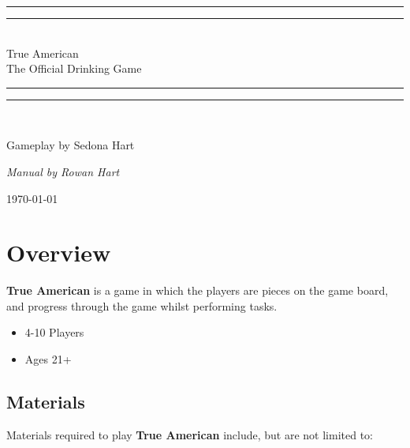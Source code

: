 \documentclass[12pt]{article}
\newlength{\drop}
\begin{document}
\begin{titlepage}
    \textheight
    \centering
    \vspace*{\baselineskip}
    \rule{\textwidth}{1.6pt}\vspace*{-\baselineskip}\vspace*{2pt}
    \rule{\textwidth}{0.4pt}\\[\baselineskip]
    {\LARGE True American \\[0.3\baselineskip] The Official Drinking Game}\\[0.2\baselineskip]
    \rule{\textwidth}{0.4pt}\vspace*{-\baselineskip}\vspace{3.2pt}
    \rule{\textwidth}{1.6pt}\\[\baselineskip]
    \scshape
    \vspace*{2\baselineskip}
    {\Large Gameplay by Sedona Hart\par}
    {\itshape Manual by Rowan Hart\par}
    \vspace*{2\baselineskip}
    {\scshape \today} \\
    \vfill
\end{titlepage}

\section{Overview} \label{overview}

\textbf{True American} is a game in which the players are pieces on the game board, and progress through the game whilst performing tasks. \\

\begin{itemize}
\item 4-10 Players
\item Ages 21+
\end{itemize}

\subsection{Materials}

Materials required to play \textbf{True American} include, but are not limited to: \\
\end{document}
